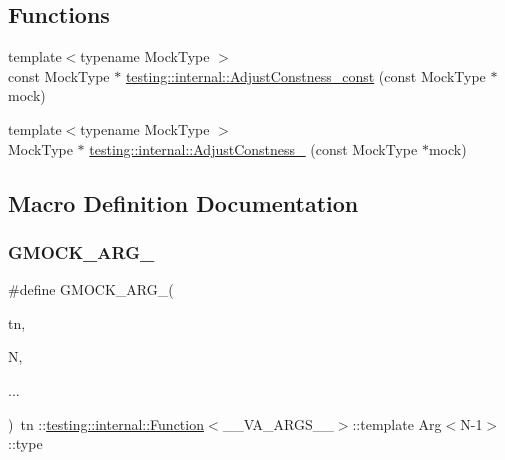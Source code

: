 \subsection*{Functions}
\begin{DoxyCompactItemize}
\item 
{\footnotesize template$<$typename Mock\+Type $>$ }\\const Mock\+Type $\ast$ \mbox{\hyperlink{namespacetesting_1_1internal_a758f640e990a927dc148d6b960c0704b}{testing\+::internal\+::\+Adjust\+Constness\+\_\+const}} (const Mock\+Type $\ast$mock)
\item 
{\footnotesize template$<$typename Mock\+Type $>$ }\\Mock\+Type $\ast$ \mbox{\hyperlink{namespacetesting_1_1internal_a5b32070bcc46f4021c80186e07bc3008}{testing\+::internal\+::\+Adjust\+Constness\+\_\+}} (const Mock\+Type $\ast$mock)
\end{DoxyCompactItemize}


\subsection{Macro Definition Documentation}
\mbox{\label{googletest-master_2googlemock_2include_2gmock_2gmock-generated-function-mockers_8h_a887575cc1c31158fba808180a10c004f}} 
\subsubsection{\texorpdfstring{GMOCK\_ARG\_}{GMOCK\_ARG\_}}
{\footnotesize\ttfamily \#define G\+M\+O\+C\+K\+\_\+\+A\+R\+G\+\_\+(\begin{DoxyParamCaption}\item[{}]{tn,  }\item[{}]{N,  }\item[{}]{... }\end{DoxyParamCaption})~tn \+::\mbox{\hyperlink{structtesting_1_1internal_1_1_function}{testing\+::internal\+::\+Function}}$<$\+\_\+\+\_\+\+V\+A\+\_\+\+A\+R\+G\+S\+\_\+\+\_\+$>$\+::template Arg$<$N-\/1$>$\+::type}

\mbox{\label{googletest-master_2googlemock_2include_2gmock_2gmock-generated-function-mockers_8h_aa87d0009fe91f1c89d658776b55a769c}} 
